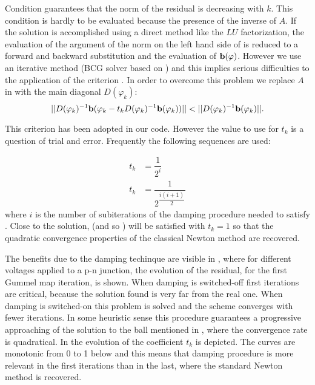 Condition  guarantees that the norm of the residual is decreasing with $k$.
This condition is hardly to be evaluated because the presence of the inverse of $A$. If the solution is accomplished using a direct method like the $LU$ factorization, the evaluation of the argument of the norm on the left hand side of  is reduced to a forward and backward substitution and the evaluation of $\mathbf{b}(\varphi)$. However we use an iterative method (BCG solver based on \cite{NumericalRecipes}) and this implies serious difficulties to the application of the criterion . In order to overcome this problem we replace $A$ in  with  the main diagonal $D(\varphi_k)$:
\begin{equation}
\label{eq: easy criterion}
||D(\varphi_k)^{-1}\vect{b}(\varphi_k-t_kD(\varphi_k)^{-1}\vect{b}(\varphi_k))||<||D(\varphi_k)^{-1}\vect{b}(\varphi_k)||.
\end{equation}

This criterion has been adopted in our code. However the value to use for $t_k$ is a question of trial and error. Frequently the following sequences are used:

\begin{align}
t_k & = \dfrac{1}{2^i} \\
t_k & = \dfrac{1}{2^{\dfrac{i(i+1)}{2}}}  
\end{align}
where $i$ is the number of subiterations of the damping procedure needed to satisfy . Close to the solution,  (and so ) will be satisfied with $t_k=1$ so that the quadratic convergence properties of the classical Newton method are recovered.

The benefits due to the damping techinque are visible in , where for different voltages applied to a p-n junction, the evolution of the residual, for the first Gummel map iteration, is shown. When damping is switched-off first iterations are critical, because the solution found is very far from the real one. When damping is switched-on this problem is solved and the scheme converges with fewer iterations. In some heuristic sense this procedure guarantees a progressive approaching of the solution to the ball mentioned in , where the convergence rate is quadratical. In  the evolution of the coefficient $t_k$ is depicted. 
The curves are monotonic from 0 to 1 below and this means that damping procedure is more relevant in the first iterations than in the last, where the standard Newton method is recovered.

